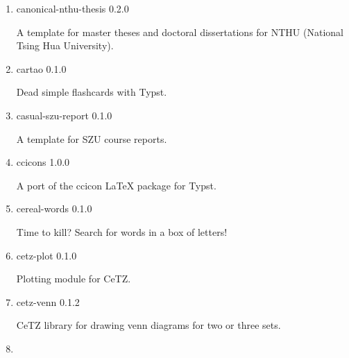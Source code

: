 \begin{enumerate}
  { caidan } { 0.1.0 }

  A clean and minimal food menu template
\item
  \href{/universe/package/canonical-nthu-thesis/}{}


  { canonical-nthu-thesis } { 0.2.0 }

  A template for master theses and doctoral dissertations for NTHU
  (National Tsing Hua University).
\item
  \href{/universe/package/cartao/}{}

  { cartao } { 0.1.0 }

  Dead simple flashcards with Typst.
\item
  \href{/universe/package/casual-szu-report/}{}


  { casual-szu-report } { 0.1.0 }

  A template for SZU course reports.
\item
  \href{/universe/package/ccicons/}{}

  { ccicons } { 1.0.0 }

  A port of the ccicon LaTeX package for Typst.
\item
  \href{/universe/package/cereal-words/}{}


  { cereal-words } { 0.1.0 }

  Time to kill? Search for words in a box of letters!
\item
  \href{/universe/package/cetz-plot/}{}

  { cetz-plot } { 0.1.0 }

  Plotting module for CeTZ.
\item
  \href{/universe/package/cetz-venn/}{}

  { cetz-venn } { 0.1.2 }

  CeTZ library for drawing venn diagrams for two or three sets.
\item
  \href{/universe/package/cheda-seu-thesis/}{}



\end{enumerate}
